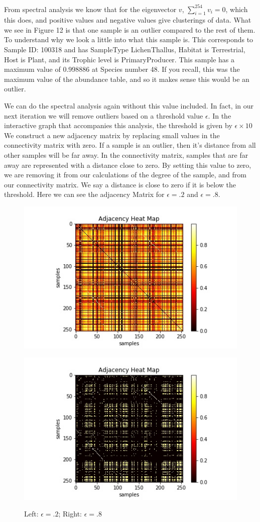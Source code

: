 \documentclass{article}
\theoremstyle{definition} \newtheorem*{lte}{Definition}
\theoremstyle{plain} \newtheorem*{csbt}{Theorem}
\begin{document}
From spectral analysis we know that for the eigenvector $v$, $\sum_{i = 1}^{254} v_i = 0$, which this does, and positive values and negative values give clusterings of data. What we see in Figure 12 is that one sample is an outlier compared to the rest of them. To understand why we look a little into what this sample is. This corresponds to Sample ID: 100318 and has SampleType LichenThallus, Habitat is Terrestrial, Host is Plant, and its Trophic level is PrimaryProducer. This sample has a maximum value of 0.998886 at Species number 48. If you recall, this was the maximum value of the abundance table, and so it makes sense this would be an outlier. 

We can do the spectral analysis again without this value included. In fact, in our next iteration we will remove outliers based on a threshold value $\epsilon$. In the interactive graph that accompanies this analysis, the threshold is given by $\epsilon  \times 10$ We construct a new adjacency matrix by replacing small values in the connectivity matrix with zero. If a sample is an outlier, then it's distance from all other samples will be far away. In the connectivity matrix, samples that are far away are represented with a distance close to zero. By setting this value to zero, we are removing it from our calculations of the degree of the sample, and from our connectivity matrix. We say a distance is close to zero if it is below the threshold. Here we can see the adjacency Matrix for $\epsilon = .2$ and $\epsilon = .8$. 

\begin{figure}[H]
\begin{center}
\begin{subfloat}{
\includegraphics[width = .4\linewidth]{AdjacencyHeatMap.jpg}
}\end{subfloat}
\begin{subfloat}{
\includegraphics[width = .4\linewidth]{AdjacencyHeatMap8.jpg}
}\end{subfloat}
\caption{Left: $\epsilon = .2$; Right: $\epsilon = .8$}
\end{center}
\end{figure}
\end{document}
